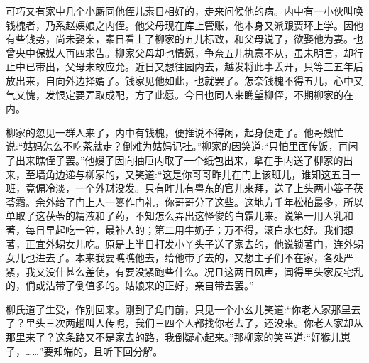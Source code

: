 \begin{parag}
    可巧又有家中几个小厮同他侄儿素日相好的，走来问候他的病。内中有一小伙叫唤钱槐者，乃系赵姨娘之内侄。他父母现在库上管账，他本身又派跟贾环上学。因他有些钱势，尚未娶亲，素日看上了柳家的五儿标致，和父母说了，欲娶他为妻。也曾央中保媒人再四求告。柳家父母却也情愿，争奈五儿执意不从，虽未明言，却行止中已带出，父母未敢应允。近日又想往园内去，越发将此事丢开，只等三五年后放出来，自向外边择婿了。钱家见他如此，也就罢了。怎奈钱槐不得五儿，心中又气又愧，发恨定要弄取成配，方了此愿。今日也同人来瞧望柳侄，不期柳家的在内。
\end{parag}


\begin{parag}
    柳家的忽见一群人来了，内中有钱槐，便推说不得闲，起身便走了。他哥嫂忙说:“姑妈怎么不吃茶就走？倒难为姑妈记挂。”柳家的因笑道:“只怕里面传饭，再闲了出来瞧侄子罢。”他嫂子因向抽屉内取了一个纸包出来，拿在手内送了柳家的出来，至墙角边递与柳家的，又笑道:“这是你哥哥昨儿在门上该班儿，谁知这五日一班，竟偏冷淡，一个外财没发。只有昨儿有粤东的官儿来拜，送了上头两小篓子茯苓霜。余外给了门上人一篓作门礼，你哥哥分了这些。这地方千年松柏最多，所以单取了这茯苓的精液和了药，不知怎么弄出这怪俊的白霜儿来。说第一用人乳和著，每日早起吃一钟，最补人的；第二用牛奶子；万不得，滚白水也好。我们想著，正宜外甥女儿吃。原是上半日打发小丫头子送了家去的，他说锁著门，连外甥女儿也进去了。本来我要瞧瞧他去，给他带了去的，又想主子们不在家，各处严紧，我又没什甚么差使，有要没紧跑些什么。况且这两日风声，闻得里头家反宅乱的，倘或沾带了倒值多的。姑娘来的正好，亲自带去罢。”
\end{parag}


\begin{parag}
    柳氏道了生受，作别回来。刚到了角门前，只见一个小幺儿笑道:“你老人家那里去了？里头三次两趟叫人传呢，我们三四个人都找你老去了，还没来。你老人家却从那里来了？这条路又不是家去的路，我倒疑心起来。”那柳家的笑骂道:“好猴儿崽子，……”要知端的，且听下回分解。
\end{parag}
